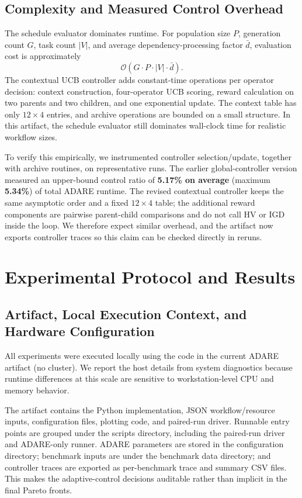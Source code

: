 \documentclass[preprint,12pt]{elsarticle}
\begin{document}
\subsection{Complexity and Measured Control Overhead}
The schedule evaluator dominates runtime. For population size $P$, generation count $G$, task count $|V|$, and average dependency-processing factor $\bar d$, evaluation cost is approximately
\begin{equation}
\mathcal{O}(G \cdot P \cdot |V| \cdot \bar d).
\end{equation}
The contextual UCB controller adds constant-time operations per operator decision: context construction, four-operator UCB scoring, reward calculation on two parents and two children, and one exponential update. The context table has only $12 \times 4$ entries, and archive operations are bounded on a small structure. In this artifact, the schedule evaluator still dominates wall-clock time for realistic workflow sizes.

To verify this empirically, we instrumented controller selection/update, together with archive routines, on representative runs. The earlier global-controller version measured an upper-bound control ratio of \textbf{5.17\% on average} (maximum \textbf{5.34\%}) of total ADARE runtime. The revised contextual controller keeps the same asymptotic order and a fixed $12 \times 4$ table; the additional reward components are pairwise parent-child comparisons and do not call HV or IGD inside the loop. We therefore expect similar overhead, and the artifact now exports controller traces so this claim can be checked directly in reruns.

\section{Experimental Protocol and Results}
\subsection{Artifact, Local Execution Context, and Hardware Configuration}
All experiments were executed locally using the code in the current ADARE artifact (no cluster). We report the host details from system diagnostics because runtime differences at this scale are sensitive to workstation-level CPU and memory behavior.

The artifact contains the Python implementation, JSON workflow/resource inputs, configuration files, plotting code, and paired-run driver. Runnable entry points are grouped under the scripts directory, including the paired-run driver and ADARE-only runner. ADARE parameters are stored in the configuration directory; benchmark inputs are under the benchmark data directory; and controller traces are exported as per-benchmark trace and summary CSV files. This makes the adaptive-control decisions auditable rather than implicit in the final Pareto fronts.
\end{document}

